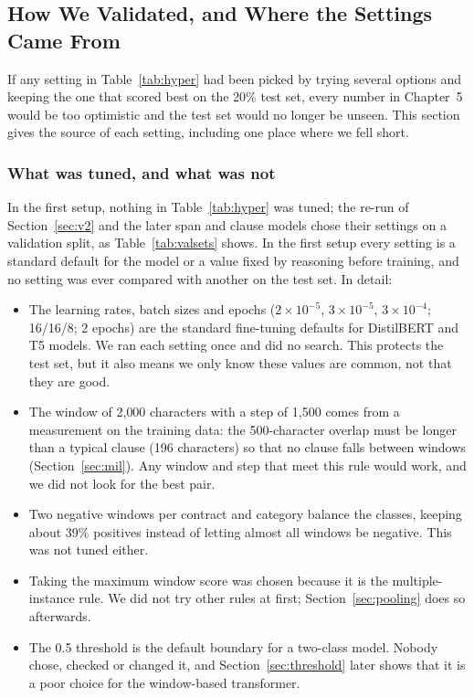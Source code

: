 \subsection{How We Validated, and Where the Settings Came From}
\label{sec:valprotocol}
If any setting in Table~\ref{tab:hyper} had been picked by trying several options and keeping the one that scored best on the 20\% test set, every number in Chapter~5 would be too optimistic and the test set would no longer be unseen. This section gives the source of each setting, including one place where we fell short.

\subsubsection{What was tuned, and what was not}
In the first setup, nothing in Table~\ref{tab:hyper} was tuned; the re-run of Section~\ref{sec:v2} and the later span and clause models chose their settings on a validation split, as Table~\ref{tab:valsets} shows. In the first setup every setting is a standard default for the model or a value fixed by reasoning before training, and no setting was ever compared with another on the test set. In detail:

\begin{itemize}[itemsep=3pt]
  \item The learning rates, batch sizes and epochs ($2\times10^{-5}$, $3\times10^{-5}$, $3\times10^{-4}$; 16/16/8; 2 epochs) are the standard fine-tuning defaults for DistilBERT and T5 models. We ran each setting once and did no search. This protects the test set, but it also means we only know these values are common, not that they are good.
  \item The window of 2{,}000 characters with a step of 1{,}500 comes from a measurement on the training data: the 500-character overlap must be longer than a typical clause (196 characters) so that no clause falls between windows (Section~\ref{sec:mil}). Any window and step that meet this rule would work, and we did not look for the best pair.
  \item Two negative windows per contract and category balance the classes, keeping about 39\% positives instead of letting almost all windows be negative. This was not tuned either.
  \item Taking the maximum window score was chosen because it is the multiple-instance rule. We did not try other rules at first; Section~\ref{sec:pooling} does so afterwards.
  \item The 0.5 threshold is the default boundary for a two-class model. Nobody chose, checked or changed it, and Section~\ref{sec:threshold} later shows that it is a poor choice for the window-based transformer.
\end{itemize}

